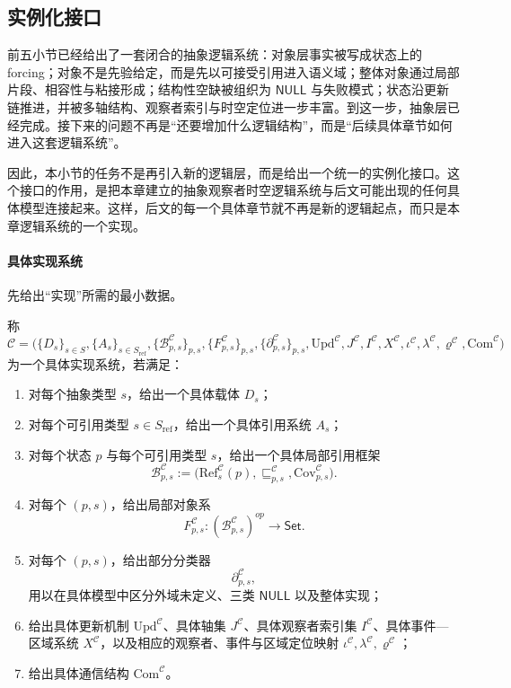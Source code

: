 \subsection{实例化接口}\label{subsec:logic-expansion-chain-instantiation-interface}

前五小节已经给出了一套闭合的抽象逻辑系统：对象层事实被写成状态上的 forcing；对象不是先验给定，而是先以可接受引用进入语义域；整体对象通过局部片段、相容性与粘接形成；结构性空缺被组织为 \(\mathsf{NULL}\) 与失败模式；状态沿更新链推进，并被多轴结构、观察者索引与时空定位进一步丰富。到这一步，抽象层已经完成。接下来的问题不再是“还要增加什么逻辑结构”，而是“后续具体章节如何进入这套逻辑系统”。

因此，本小节的任务不是再引入新的逻辑层，而是给出一个统一的实例化接口。这个接口的作用，是把本章建立的抽象观察者时空逻辑系统与后文可能出现的任何具体模型连接起来。这样，后文的每一个具体章节就不再是新的逻辑起点，而只是本章逻辑系统的一个实现。

\paragraph{具体实现系统}
先给出“实现”所需的最小数据。

\begin{definition}[具体实现系统]\label{def:logic-expansion-concrete-implementation-system}
称
\[
\mathcal C=
\bigl(
\{D_s\}_{s\in S},
\{A_s\}_{s\in S_{\mathrm{ref}}},
\{\mathcal B^{\mathcal C}_{p,s}\}_{p,s},
\{F^{\mathcal C}_{p,s}\}_{p,s},
\{\partial^{\mathcal C}_{p,s}\}_{p,s},
\mathrm{Upd}^{\mathcal C},
J^{\mathcal C},
I^{\mathcal C},
X^{\mathcal C},
\iota^{\mathcal C},
\lambda^{\mathcal C},
\varrho^{\mathcal C},
\mathrm{Com}^{\mathcal C}
\bigr)
\]
为一个具体实现系统，若满足：
\begin{enumerate}
  \item 对每个抽象类型 \(s\)，给出一个具体载体 \(D_s\)；
  \item 对每个可引用类型 \(s\in S_{\mathrm{ref}}\)，给出一个具体引用系统 \(A_s\)；
  \item 对每个状态 \(p\) 与每个可引用类型 \(s\)，给出一个具体局部引用框架
  \[
  \mathcal B^{\mathcal C}_{p,s}
  :=
  \bigl(
  \mathrm{Ref}^{\mathcal C}_s(p),
  \sqsubseteq^{\mathcal C}_{p,s},
  \mathrm{Cov}^{\mathcal C}_{p,s}
  \bigr).
  \]
  \item 对每个 \((p,s)\)，给出局部对象系
  \[
  F^{\mathcal C}_{p,s}:(\mathcal B^{\mathcal C}_{p,s})^{op}\to \mathsf{Set}.
  \]
  \item 对每个 \((p,s)\)，给出部分分类器
  \[
  \partial^{\mathcal C}_{p,s},
  \]
  用以在具体模型中区分外域未定义、三类 \(\mathsf{NULL}\) 以及整体实现；
  \item 给出具体更新机制 \(\mathrm{Upd}^{\mathcal C}\)、具体轴集 \(J^{\mathcal C}\)、具体观察者索引集 \(I^{\mathcal C}\)、具体事件—区域系统 \(X^{\mathcal C}\)，以及相应的观察者、事件与区域定位映射 \(\iota^{\mathcal C},\lambda^{\mathcal C},\varrho^{\mathcal C}\)；
  \item 给出具体通信结构 \(\mathrm{Com}^{\mathcal C}\)。
\end{enumerate}
\end{definition}

